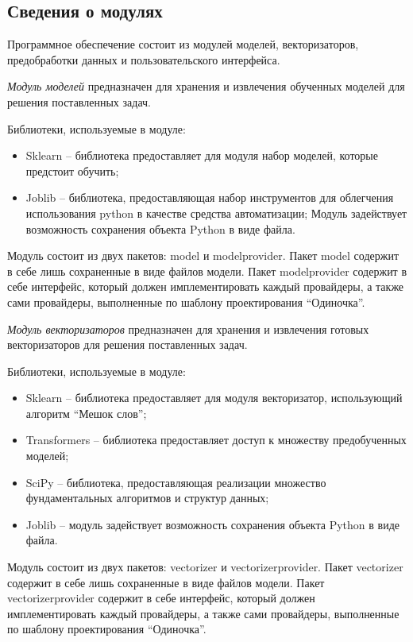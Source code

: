 \subsection{Сведения о модулях}

Программное обеспечение состоит из модулей моделей, векторизаторов, предобработки данных и пользовательского интерфейса.

\textit{Модуль моделей} предназначен для хранения и извлечения обученных моделей для решения поставленных задач.

Библиотеки, используемые в модуле:
\begin{itemize}
	\item Sklearn -- библиотека предоставляет для модуля набор моделей, которые предстоит обучить;
	\item Joblib \cite{joblib} -- библиотека, предоставляющая набор инструментов для облегчения использования python в качестве средства автоматизации; Модуль задействует возможность сохранения объекта Python в виде файла.
\end{itemize}

Модуль состоит из двух пакетов: model и modelprovider. 
Пакет model содержит в себе лишь сохраненные в виде файлов модели.
Пакет modelprovider содержит в себе интерфейс, который должен имплементировать каждый провайдеры, а также сами провайдеры, выполненные по шаблону проектирования ``Одиночка''.


\textit{Модуль векторизаторов} предназначен для хранения и извлечения готовых векторизаторов для решения поставленных задач.

Библиотеки, используемые в модуле:
\begin{itemize}
	\item Sklearn -- библиотека предоставляет для модуля векторизатор, использующий алгоритм ``Мешок слов'';
	\item Transformers \cite{transformers} -- библиотека предоставляет доступ к множеству предобученных моделей;
	\item SciPy \cite{scipy} -- библиотека, предоставляющая реализации множество фундаментальных алгоритмов и структур данных;
	\item Joblib \cite{joblib} -- модуль задействует возможность сохранения объекта Python в виде файла.
\end{itemize}

Модуль состоит из двух пакетов: vectorizer и vectorizerprovider. 
Пакет vectorizer содержит в себе лишь сохраненные в виде файлов модели.
Пакет vectorizerprovider содержит в себе интерфейс, который должен имплементировать каждый провайдеры, а также сами провайдеры, выполненные по шаблону проектирования ``Одиночка''.


